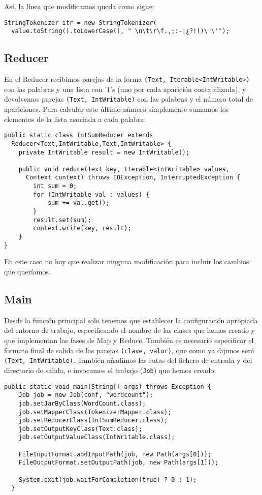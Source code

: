 \documentclass[11pt]{article}
\begin{document}
Así, la línea que modificamos queda como sigue:
\begin{verbatim}
StringTokenizer itr = new StringTokenizer(
  value.toString().toLowerCase(), " \n\t\r\f.,;:-¡¿?!()\"\'");
\end{verbatim}

\subsection*{Reducer}

En el Reducer recibimos parejas de la forma  \verb|(Text, Iterable<IntWritable>)| con las palabras y una lista con '$1$'s (uno por cada aparición contabilizada), y devolvemos parejas \verb|(Text, IntWritable)| con las palabras y el número total de apariciones. Para calcular este último número simplemente sumamos los elementos de la lista asociada a cada palabra.

\begin{verbatim}
public static class IntSumReducer extends
  Reducer<Text,IntWritable,Text,IntWritable> {
    private IntWritable result = new IntWritable();

    public void reduce(Text key, Iterable<IntWritable> values,
      Context context) throws IOException, InterruptedException {
        int sum = 0;
        for (IntWritable val : values) {
            sum += val.get();
        }
        result.set(sum);
        context.write(key, result);
    }
}
\end{verbatim}

En este caso no hay que realizar ninguna modificación para incluir los cambios que queríamos.

\subsection*{Main}

Desde la función principal solo tenemos que establecer la configuración apropiada del entorno de trabajo, especificando el nombre de las clases que hemos creado y que implementan las fases de Map y Reduce. También es necesario especificar el formato final de salida de las parejas \verb|(clave, valor)|, que como ya dijimos será \verb|(Text, IntWritable)|. También añadimos las rutas del fichero de entrada y del directorio de salida, e invocamos el trabajo (\verb|Job|) que hemos creado.

\begin{verbatim}
public static void main(String[] args) throws Exception {
    Job job = new Job(conf, "wordcount");
    job.setJarByClass(WordCount.class);
    job.setMapperClass(TokenizerMapper.class);
    job.setReducerClass(IntSumReducer.class);
    job.setOutputKeyClass(Text.class);
    job.setOutputValueClass(IntWritable.class);

    FileInputFormat.addInputPath(job, new Path(args[0]));
    FileOutputFormat.setOutputPath(job, new Path(args[1]));

    System.exit(job.waitForCompletion(true) ? 0 : 1);
  }
\end{verbatim}
\end{document}
